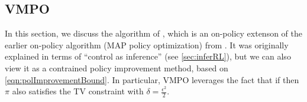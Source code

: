 


\subsection{VMPO}
\label{sec:MPO}
\label{sec:VMPO}


In this section, we discuss
the  algorithm of \citep{VMPO},
which is an on-policy extenson of the earlier
on-policy  algorithm (MAP policy optimization)
from \citep{Abdolmaleki2018}.
It was originally explained in terms of ``control as inference''
(see \cref{sec:inferRL}),
but we can also view it as
a  contrained policy improvement method,
based on   \cref{eqn:polImprovementBound}.
In particular, VMPO leverages the fact that if
\be
{} \leq \delta
\ee
then $\pi$ also satisfies the TV constraint
with $\delta=\frac{\epsilon^2}{2}$.

